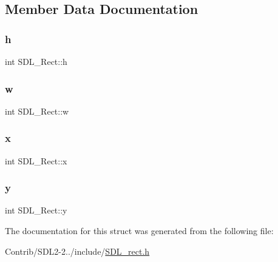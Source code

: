\subsection{Member Data Documentation}
\mbox{\label{struct_s_d_l___rect_a0a17d46b320af8063b746153348edd72}} 
\subsubsection{\texorpdfstring{h}{h}}
{\footnotesize\ttfamily int S\+D\+L\+\_\+\+Rect\+::h}

\mbox{\label{struct_s_d_l___rect_a56b7be5738fb6fab86881534a814c45e}} 
\subsubsection{\texorpdfstring{w}{w}}
{\footnotesize\ttfamily int S\+D\+L\+\_\+\+Rect\+::w}

\mbox{\label{struct_s_d_l___rect_a85418d94621dd6855805c4b5c7bf6482}} 
\subsubsection{\texorpdfstring{x}{x}}
{\footnotesize\ttfamily int S\+D\+L\+\_\+\+Rect\+::x}

\mbox{\label{struct_s_d_l___rect_a822694af8ddca5fd0d5d94e47106ab85}} 
\subsubsection{\texorpdfstring{y}{y}}
{\footnotesize\ttfamily int S\+D\+L\+\_\+\+Rect\+::y}



The documentation for this struct was generated from the following file\+:\begin{DoxyCompactItemize}
\item 
Contrib/\+S\+D\+L2-\/2../include/\mbox{\hyperlink{_s_d_l__rect_8h}{S\+D\+L\+\_\+rect.\+h}}\end{DoxyCompactItemize}
